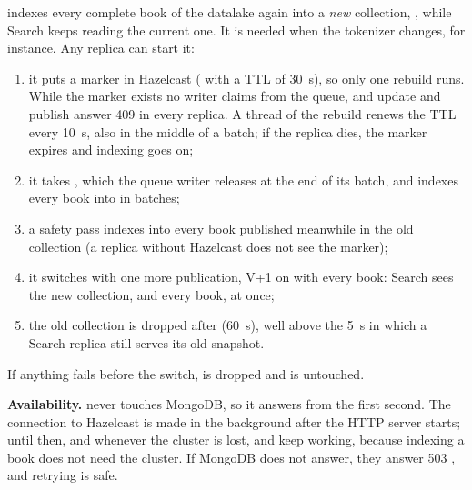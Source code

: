  indexes every complete book of the datalake again into a \emph{new} collection,
, while Search keeps reading the current one. It is needed when the tokenizer changes, for
instance. Any replica can start it:
\begin{enumerate}
  \item it puts a marker in Hazelcast ( with a TTL of 30~s), so only one rebuild runs. While the
        marker exists no writer claims from the queue, and update and publish answer 409 in every replica. A thread of
        the rebuild renews the TTL every 10~s, also in the middle of a batch; if the replica dies, the marker expires
        and indexing goes on;
  \item it takes , which the queue writer releases at the end of its batch, and indexes every book
        into  in batches;
  \item a safety pass indexes into  every book published meanwhile in the old collection (a replica without
        Hazelcast does not see the marker);
  \item it switches with one more publication, V+1 on  with every book: Search sees the new collection, and
        every book, at once;
  \item the old collection is dropped after  (60~s), well above the 5~s in which a
        Search replica still serves its old snapshot.
\end{enumerate}
If anything fails before the switch,  is dropped and  is untouched.

\textbf{Availability.}  never touches MongoDB, so it answers from the first second. The connection to
Hazelcast is made in the background after the HTTP server starts; until then, and whenever the cluster is lost,
 and  keep working, because indexing a book does not need the
cluster. If MongoDB does not answer, they answer 503 , and retrying is safe.
